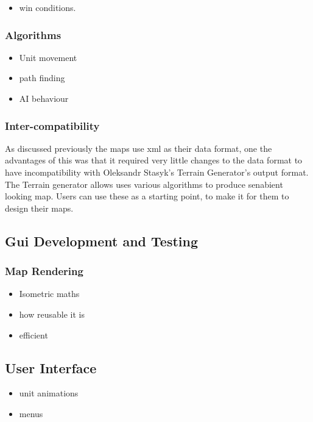 \begin{itemize}
	\item win conditions.
\end{itemize}

\subsubsection{Algorithms}
\label{ssub:Algorithms}

\begin{itemize}
	\item Unit movement
	\item path finding
	\item AI behaviour
\end{itemize}

\subsubsection{Inter-compatibility}
\label{ssub:intercompatibility}
As discussed previously the maps use xml as their data format, one the advantages of this was that it required very little changes to the data format to have incompatibility with Oleksandr Stasyk's  Terrain Generator's output format.  The Terrain generator allows uses various algorithms to produce senabient looking map. Users can use these as a starting  point, to make it for them to design their maps.


\subsection{Gui Development and Testing}

\subsubsection{Map Rendering}
\label{ssub:map_rendering}

\begin{itemize}
	\item Isometric maths
	\item how reusable it is
	\item efficient 
\end{itemize}

\subsection{User Interface}

\begin{itemize}
	\item unit animations
	\item menus
\end{itemize}

